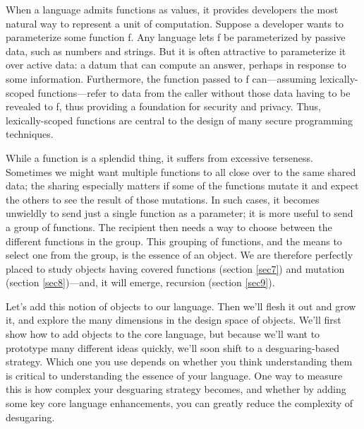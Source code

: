 \secdown

When a language admits functions as values, it provides developers the most
natural way to represent a unit of computation. Suppose a developer wants to
parameterize some function f. Any language lets f be parameterized by passive
data, such as numbers and strings. But it is often attractive to parameterize it
over active data: a datum that can compute an answer, perhaps in response to
some information. Furthermore, the function passed to f can—assuming
lexically-scoped functions—refer to data from the caller without those data
having to be revealed to f, thus providing a foundation for security and
privacy. Thus, lexically-scoped functions are central to the design of many
secure programming techniques.

While a function is a splendid thing, it suffers from excessive terseness.
Sometimes we might want multiple functions to all close over to the same shared
data; the sharing especially matters if some of the functions mutate it and
expect the others to see the result of those mutations. In such cases, it
becomes unwieldly to send just a single function as a parameter; it is more
useful to send a group of functions. The recipient then needs a way to choose
between the different functions in the group. This grouping of functions, and
the means to select one from the group, is the essence of an object.
We are therefore perfectly placed to study objects having covered functions
(section \ref{sec7}) and mutation (section \ref{sec8})—and, it will emerge,
recursion (section \ref{sec9}).

Let’s add this notion of objects to our language. Then we’ll flesh it out and
grow it, and explore the many dimensions in the design space of objects. We’ll
first show how to add objects to the core language, but because we’ll want to
prototype many different ideas quickly, we’ll soon shift to a desguaring-based
strategy. Which one you use depends on whether you think understanding them is
critical to understanding the essence of your language. One way to measure this
is how complex your desguaring strategy becomes, and whether by adding some key
core language enhancements, you can greatly reduce the complexity of desugaring.




\secup
